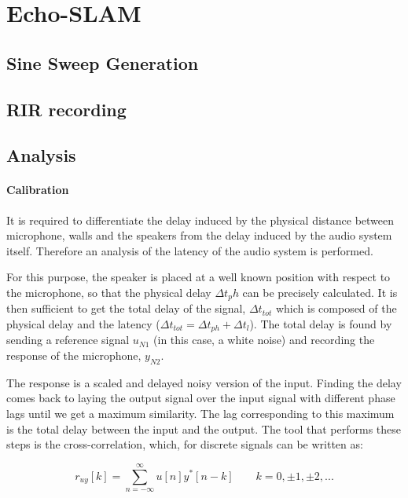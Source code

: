 \section{Echo-SLAM}

\subsection{Sine Sweep Generation}

\subsection{RIR recording}

\subsection{Analysis}

\paragraph{Calibration}

It is required to differentiate the delay induced by the physical distance between microphone, walls and the speakers from the delay induced by the audio system itself. Therefore an analysis of the latency of the audio system is performed. 

For this purpose, the speaker is placed at a well known position with respect to the microphone, so that the physical delay $\Delta t_ph$ can be precisely calculated. It is then sufficient to get the total delay of the signal, $\Delta t_{tot}$ which is composed of the physical delay and the latency ($\Delta t_{tot}=\Delta t_{ph}+\Delta t_{l}$). The total delay is found by sending a reference signal $u_{N1}$ (in this case, a white noise) and recording the response of the microphone, $y_{N2}$.

The response is a scaled and delayed noisy version of the input. Finding the delay comes back to laying the output signal over the input signal with different phase lags until we get a maximum similarity. The lag corresponding to this maximum is the total delay between the input and the output. The tool that performs these steps is the cross-correlation, which, for discrete signals can be written as: 

\begin{equation}
	r_{uy}[k] = \sum\limits_{n=-\infty}^{\infty} u[n]y^*[n-k] \hspace{2em} k=0,\pm1,\pm2,...
\end{equation}

